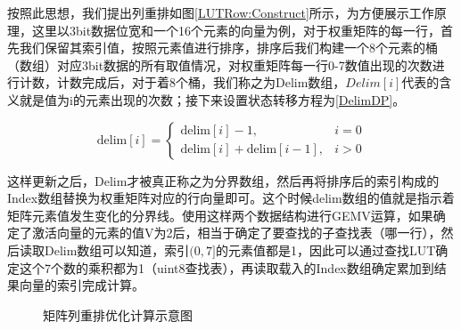 按照此思想，我们提出列重排如图\ref{LUTRow:Construct}所示，为方便展示工作原理，这里以3bit数据位宽和一个16个元素的向量为例，对于权重矩阵的每一行，首先我们保留其索引值，按照元素值进行排序，排序后我们构建一个8个元素的桶（数组）对应3bit数据的所有取值情况，对权重矩阵每一行0-7数值出现的次数进行计数，计数完成后，对于着8个桶，我们称之为Delim数组，$Delim[i]$代表的含义就是值为i的元素出现的次数；接下来设置状态转移方程为\ref{DelimDP}。

\begin{equation}
    \text{delim}[i] = \begin{cases}
        \text{delim}[i] - 1, & i = 0 \\
        \text{delim}[i] + \text{delim}[i - 1], & i > 0
    \end{cases}
    \label{DelimDP}
\end{equation}

这样更新之后，Delim才被真正称之为分界数组，然后再将排序后的索引构成的Index数组替换为权重矩阵对应的行向量即可。这个时候delim数组的值就是指示着矩阵元素值发生变化的分界线。使用这样两个数据结构进行GEMV运算，如果确定了激活向量的元素的值V为2后，相当于确定了要查找的子查找表（哪一行），然后读取Delim数组可以知道，索引$(0,7]$的元素值都是1，因此可以通过查找LUT确定这个7个数的乘积都为1（uint8查找表），再读取载入的Index数组确定累加到结果向量的索引完成计算。

\begin{figure}[htbp!]
	\centering
	\label{LUTRow}
	\caption{矩阵列重排优化计算示意图}
\end{figure}

